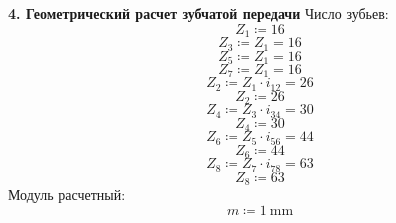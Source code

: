 \documentclass{article}
\newcommand{\defeq}{\coloneq} %
\begin{document}
\colorbox[HTML]{000000}{\textbf{4. Геометрический расчет зубчатой передачи}}\newline
\colorbox[HTML]{000000}{Число зубьев:}\newline
\begin{equation*}
\textit{Z}_{\textit{1}} \defeq 16
\end{equation*}
\begin{equation*}
\textit{Z}_{\textit{3}} \defeq \textit{Z}_{\textit{1}} = {16}
\end{equation*}
\begin{equation*}
\textit{Z}_{\textit{5}} \defeq \textit{Z}_{\textit{1}} = {16}
\end{equation*}
\begin{equation*}
\textit{Z}_{\textit{7}} \defeq \textit{Z}_{\textit{1}} = {16}
\end{equation*}
\begin{equation*}
\textit{Z}_{\textit{2}} \defeq \textit{Z}_{\textit{1}} \cdot \textit{i}_{\textit{12}} = {26}
\end{equation*}
\begin{equation*}
\textit{Z}_{\textit{2}} \defeq 26
\end{equation*}
\begin{equation*}
\textit{Z}_{\textit{4}} \defeq \textit{Z}_{\textit{3}} \cdot \textit{i}_{\textit{34}} = {30}
\end{equation*}
\begin{equation*}
\textit{Z}_{\textit{4}} \defeq 30
\end{equation*}
\begin{equation*}
\textit{Z}_{\textit{6}} \defeq \textit{Z}_{\textit{5}} \cdot \textit{i}_{\textit{56}} = {44}
\end{equation*}
\begin{equation*}
\textit{Z}_{\textit{6}} \defeq 44
\end{equation*}
\begin{equation*}
\textit{Z}_{\textit{8}} \defeq \textit{Z}_{\textit{7}} \cdot \textit{i}_{\textit{78}} = {63}
\end{equation*}
\begin{equation*}
\textit{Z}_{\textit{8}} \defeq 63
\end{equation*}
\colorbox[HTML]{000000}{Модуль расчетный:}\newline
\begin{equation*}
m \defeq 1 \: \mathrm{mm}
\end{equation*}
\end{document}
